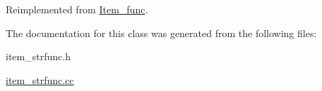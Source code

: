 Reimplemented from \mbox{\hyperlink{classItem__func_a6413cdbe7b14be77cc47462c9fc87ddb}{Item\+\_\+func}}.



The documentation for this class was generated from the following files\+:\begin{DoxyCompactItemize}
\item 
item\+\_\+strfunc.\+h\item 
\mbox{\hyperlink{item__strfunc_8cc}{item\+\_\+strfunc.\+cc}}\end{DoxyCompactItemize}
